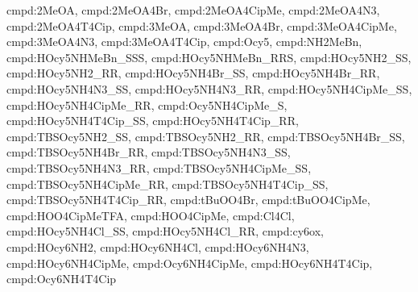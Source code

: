 {cmpd:2MeOA, cmpd:2MeOA4Br, cmpd:2MeOA4CipMe, cmpd:2MeOA4N3, cmpd:2MeOA4T4Cip, 
cmpd:3MeOA, cmpd:3MeOA4Br, cmpd:3MeOA4CipMe, cmpd:3MeOA4N3, cmpd:3MeOA4T4Cip, 
cmpd:Ocy5, cmpd:NH2MeBn, cmpd:HOcy5NHMeBn_SSS, cmpd:HOcy5NHMeBn_RRS, cmpd:HOcy5NH2_SS, cmpd:HOcy5NH2_RR, 
cmpd:HOcy5NH4Br_SS, cmpd:HOcy5NH4Br_RR, 
cmpd:HOcy5NH4N3_SS, cmpd:HOcy5NH4N3_RR, 
cmpd:HOcy5NH4CipMe_SS, cmpd:HOcy5NH4CipMe_RR, 
cmpd:Ocy5NH4CipMe_S, 
cmpd:HOcy5NH4T4Cip_SS, cmpd:HOcy5NH4T4Cip_RR, 
cmpd:TBSOcy5NH2_SS, cmpd:TBSOcy5NH2_RR, 
cmpd:TBSOcy5NH4Br_SS, cmpd:TBSOcy5NH4Br_RR, 
cmpd:TBSOcy5NH4N3_SS, cmpd:TBSOcy5NH4N3_RR, 
cmpd:TBSOcy5NH4CipMe_SS, cmpd:TBSOcy5NH4CipMe_RR, 
cmpd:TBSOcy5NH4T4Cip_SS, cmpd:TBSOcy5NH4T4Cip_RR, 
cmpd:tBuOO4Br, cmpd:tBuOO4CipMe, cmpd:HOO4CipMeTFA, cmpd:HOO4CipMe,
cmpd:Cl4Cl, cmpd:HOcy5NH4Cl_SS, cmpd:HOcy5NH4Cl_RR,  
cmpd:cy6ox, cmpd:HOcy6NH2, cmpd:HOcy6NH4Cl, cmpd:HOcy6NH4N3, cmpd:HOcy6NH4CipMe, cmpd:Ocy6NH4CipMe, cmpd:HOcy6NH4T4Cip, cmpd:Ocy6NH4T4Cip}
